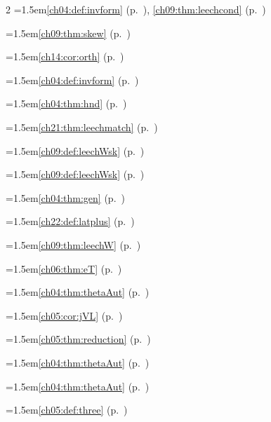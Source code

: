 \begin{multicols}{2}
\hangindent=1.5em\quad \ref{ch04:def:invform} (p.~\pageref{ch04:def:invform}), \ref{ch09:thm:leechcond} (p.~\pageref{ch09:thm:leechcond})\par
\hangindent=1.5em\quad \ref{ch09:thm:skew} (p.~\pageref{ch09:thm:skew})\par
\hangindent=1.5em\quad \ref{ch14:cor:orth} (p.~\pageref{ch14:cor:orth})\par
\hangindent=1.5em\quad \ref{ch04:def:invform} (p.~\pageref{ch04:def:invform})\par
\hangindent=1.5em\quad \ref{ch04:thm:hnd} (p.~\pageref{ch04:thm:hnd})\par
\hangindent=1.5em\quad \ref{ch21:thm:leechmatch} (p.~\pageref{ch21:thm:leechmatch})\par
\hangindent=1.5em\quad \ref{ch09:def:leechWsk} (p.~\pageref{ch09:def:leechWsk})\par
\hangindent=1.5em\quad \ref{ch09:def:leechWsk} (p.~\pageref{ch09:def:leechWsk})\par
\hangindent=1.5em\quad \ref{ch04:thm:gen} (p.~\pageref{ch04:thm:gen})\par
\hangindent=1.5em\quad \ref{ch22:def:latplus} (p.~\pageref{ch22:def:latplus})\par
\hangindent=1.5em\quad \ref{ch09:thm:leechW} (p.~\pageref{ch09:thm:leechW})\par
\hangindent=1.5em\quad \ref{ch06:thm:eT} (p.~\pageref{ch06:thm:eT})\par
\hangindent=1.5em\quad \ref{ch04:thm:thetaAut} (p.~\pageref{ch04:thm:thetaAut})\par
\hangindent=1.5em\quad \ref{ch05:cor:jVL} (p.~\pageref{ch05:cor:jVL})\par
\hangindent=1.5em\quad \ref{ch05:thm:reduction} (p.~\pageref{ch05:thm:reduction})\par
\hangindent=1.5em\quad \ref{ch04:thm:thetaAut} (p.~\pageref{ch04:thm:thetaAut})\par
\hangindent=1.5em\quad \ref{ch04:thm:thetaAut} (p.~\pageref{ch04:thm:thetaAut})\par
\hangindent=1.5em\quad \ref{ch05:def:three} (p.~\pageref{ch05:def:three})\par

\end{multicols}
